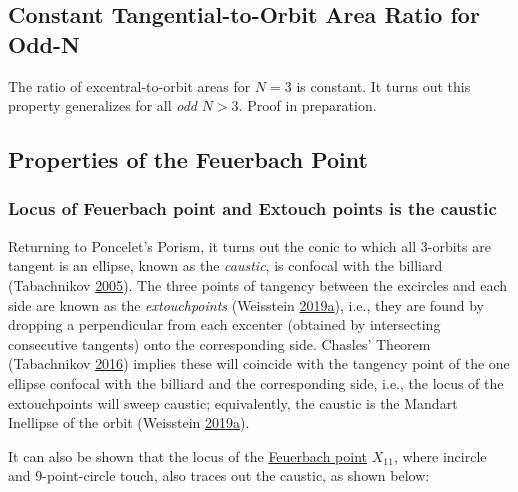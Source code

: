 \documentclass[]{article}
\begin{document}
\hypertarget{constant-tangential-to-orbit-area-ratio-for-odd-n}{%
\subsection{Constant Tangential-to-Orbit Area Ratio for Odd-N}\label{constant-tangential-to-orbit-area-ratio-for-odd-n}}

The ratio of excentral-to-orbit areas for \(N=3\) is constant. It turns out this property generalizes for all \emph{odd} \(N>3\). Proof in preparation.

\hypertarget{properties-of-the-feuerbach-point}{%
\subsection{Properties of the Feuerbach Point}\label{properties-of-the-feuerbach-point}}

\hypertarget{locus-of-feuerbach-point-and-extouch-points-is-the-caustic}{%
\subsubsection{Locus of Feuerbach point and Extouch points is the caustic}\label{locus-of-feuerbach-point-and-extouch-points-is-the-caustic}}

Returning to Poncelet's Porism, it turns out the conic to which all 3-orbits are tangent is an ellipse, known as the \emph{caustic}, is confocal with the billiard (Tabachnikov \protect\hyperlink{ref-sergei91}{2005}). The three points of tangency between the excircles and each side are known as the \emph{extouchpoints} (Weisstein \protect\hyperlink{ref-mw}{2019}\protect\hyperlink{ref-mw}{a}), i.e., they are found by dropping a perpendicular from each excenter (obtained by intersecting consecutive tangents) onto the corresponding side. Chasles' Theorem (Tabachnikov \protect\hyperlink{ref-sergei2016proj}{2016}) implies these will coincide with the tangency point of the one ellipse confocal with the billiard and the corresponding side, i.e., the locus of the extouchpoints will sweep caustic; equivalently, the caustic is the Mandart Inellipse of the orbit (Weisstein \protect\hyperlink{ref-mw}{2019}\protect\hyperlink{ref-mw}{a}).

It can also be shown that the locus of the \href{https://en.wikipedia.org/wiki/Feuerbach_point}{Feuerbach point} \(X_{11}\), where incircle and 9-point-circle touch, also traces out the caustic, as shown below:
\end{document}
